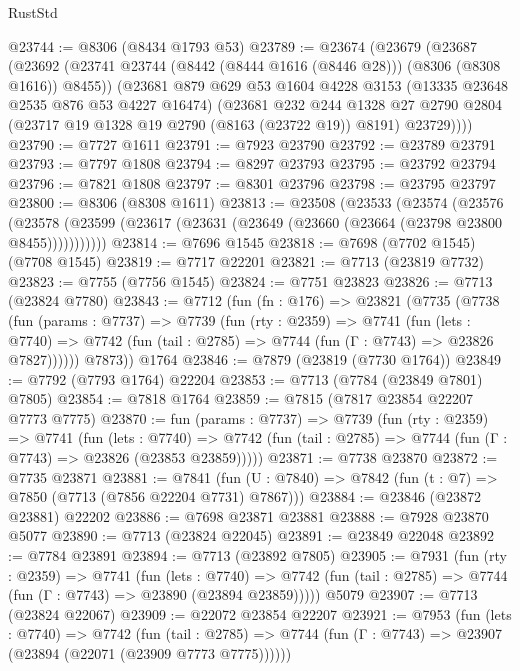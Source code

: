 \begin{lexlean}{RustStd}
\begin{coremodule}
@23744 := @8306 (@8434 @1793 @53)
@23789 := @23674
    (@23679
      (@23687
        (@23692 (@23741 @23744 (@8442 (@8444 @1616 (@8446 @28))) (@8306 (@8308 @1616)) @8455))
        (@23681
          @879
          @629
          @53
          @1604
          @4228
          @3153
          (@13335 @23648 @2535 @876 @53 @4227 @16474)
          (@23681
            @232
            @244
            @1328
            @27
            @2790
            @2804
            (@23717 @19 @1328 @19 @2790 (@8163 (@23722 @19)) @8191)
            @23729))))
@23790 := @7727 @1611
@23791 := @7923 @23790
@23792 := @23789 @23791
@23793 := @7797 @1808
@23794 := @8297 @23793
@23795 := @23792 @23794
@23796 := @7821 @1808
@23797 := @8301 @23796
@23798 := @23795 @23797
@23800 := @8306 (@8308 @1611)
@23813 := @23508
    (@23533
      (@23574
        (@23576
          (@23578 (@23599 (@23617 (@23631 (@23649 (@23660 (@23664 (@23798 @23800 @8455)))))))))))
@23814 := @7696 @1545
@23818 := @7698 (@7702 @1545) (@7708 @1545)
@23819 := @7717 @22201
@23821 := @7713 (@23819 @7732)
@23823 := @7755 (@7756 @1545)
@23824 := @7751 @23823
@23826 := @7713 (@23824 @7780)
@23843 := @7712
    (fun (fn : @176) =>
    @23821
      (@7735
        (@7738
          (fun (params : @7737) =>
          @7739
            (fun (rty : @2359) =>
            @7741
              (fun (lets : @7740) =>
              @7742 (fun (tail : @2785) => @7744 (fun (Γ : @7743) => @23826 @7827))))))
        @7873))
    @1764
@23846 := @7879 (@23819 (@7730 @1764))
@23849 := @7792 (@7793 @1764) @22204
@23853 := @7713 (@7784 (@23849 @7801) @7805)
@23854 := @7818 @1764
@23859 := @7815 (@7817 @23854 @22207 @7773 @7775)
@23870 := fun (params : @7737) =>
  @7739
    (fun (rty : @2359) =>
    @7741
      (fun (lets : @7740) =>
      @7742 (fun (tail : @2785) => @7744 (fun (Γ : @7743) => @23826 (@23853 @23859)))))
@23871 := @7738 @23870
@23872 := @7735 @23871
@23881 := @7841
    (fun (U : @7840) => @7842 (fun (t : @7) => @7850 (@7713 (@7856 @22204 @7731) @7867)))
@23884 := @23846 (@23872 @23881) @22202
@23886 := @7698 @23871 @23881
@23888 := @7928 @23870 @5077
@23890 := @7713 (@23824 @22045)
@23891 := @23849 @22048
@23892 := @7784 @23891
@23894 := @7713 (@23892 @7805)
@23905 := @7931
    (fun (rty : @2359) =>
    @7741
      (fun (lets : @7740) =>
      @7742 (fun (tail : @2785) => @7744 (fun (Γ : @7743) => @23890 (@23894 @23859)))))
    @5079
@23907 := @7713 (@23824 @22067)
@23909 := @22072 @23854 @22207
@23921 := @7953
    (fun (lets : @7740) =>
    @7742
      (fun (tail : @2785) =>
      @7744 (fun (Γ : @7743) => @23907 (@23894 (@22071 (@23909 @7773 @7775))))))

\end{coremodule}
\end{lexlean}
